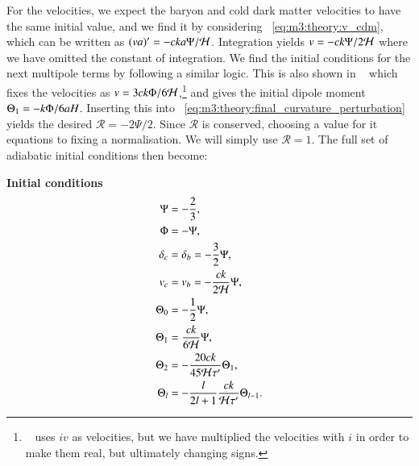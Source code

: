         For the velocities, we expect the baryon and cold dark matter velocities to have the same initial value, and we find it by considering ~\cref{eq:m3:theory:v_cdm}, which can be written as $(va)'=-cka\Psi/\mathcal{H}$. Integration yields $v=-ck\Psi/2\mathcal{H}$ where we have omitted the constant of integration. We find the initial conditions for the next multipole terms by following a similar logic. This is also shown in ~\cite[Eq. 7.59]{dodelson2020modern} which fixes the velocities as $v=3ck\Phi/6\mathcal{H}$,\footnote{~\cite{dodelson2020modern} uses $iv$ as velocities, but we have multiplied the velocities with $i$ in order to make them real, but ultimately changing signs.} and gives the initial dipole moment $\Theta_1 = -k\Phi/6aH$. Inserting this into ~\cref{eq:m3:theory:final_curvature_perturbation} yields the desired $\mathcal{R}=-2\Psi/2$. Since $\mathcal{R}$ is conserved, choosing a value for it equations to fixing a normalisation. We will simply use $\mathcal{R}=1$. The full set of adiabatic initial conditions then become: 
        
        \begin{tcolorbox}[
            width=1.025\linewidth,
            colback=blue!5!white,
            colframe=white
            ]
            \textbf{Initial conditions}
            \begin{subequations}\label{eq:m3:theory:initial_conditions}
                \begin{align}
                    \Psi &= -\frac{2}{3}, \label{eq:m3:theory:initial_conditions_Psi}\\
                    \Phi &= -\Psi, \label{eq:m3:theory:initial_conditions_Phi}\\
                    \delta_c &= \delta_b = -\frac{3}{2}\Psi, \label{eq:m3:theory:initial_conditions_deltas}\\
                    v_c &= v_b = -\frac{ck}{2\mathcal{H}}\Psi, \label{eq:m3:theory:initial_conditions_vs}\\ 
                    \Theta_0 &= -\frac{1}{2}\Psi, \label{eq:m3:theory:initial_conditions_monopole}\\
                    \Theta_1 &= \frac{ck}{6\mathcal{H}}\Psi, \label{eq:m3:theory:initial_conditions_dipole}\\
                    \Theta_2 &= -\frac{20ck}{45\mathcal{H}\tau'}\Theta_1, \label{eq:m3:theory:initial_conditions_quadrapole}\\
                    \Theta_l &= -\frac{l}{2l+1}\frac{ck}{\mathcal{H}\tau'}\Theta_{l-1}.\label{eq:m3:theory:initial_conditions_multipoles}
                \end{align}
            \end{subequations}
        \end{tcolorbox}

